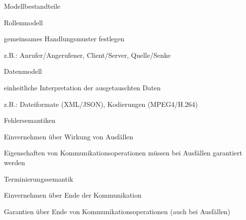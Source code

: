 \documentclass[10pt]{article}
\begin{document}
Modellbestandteile
\begin{itemize*}
  \item Rollenmodell
  \begin{itemize*}
    \item gemeinsames Handlungsmuster festlegen
    \item z.B.: Anrufer/Angerufener, Client/Server, Quelle/Senke
  \end{itemize*}
  \item Datenmodell
  \begin{itemize*}
    \item einheitliche Interpretation der ausgetauschten Daten
    \item z.B.: Dateiformate (XML/JSON), Kodierungen (MPEG4/H.264)
  \end{itemize*}
  \item Fehlersemantiken
  \begin{itemize*}
    \item Einvernehmen über Wirkung von Ausfällen
    \item Eigenschaften von Kommunikationsoperationen müssen bei Ausfällen garantiert werden
  \end{itemize*}
  \item Terminierungssemantik
  \begin{itemize*}
    \item Einvernehmen über Ende der Kommunikation
    \item Garantien über Ende von Kommunikationsoperationen (auch bei Ausfällen)
  \end{itemize*}
\end{itemize*}
\end{document}
